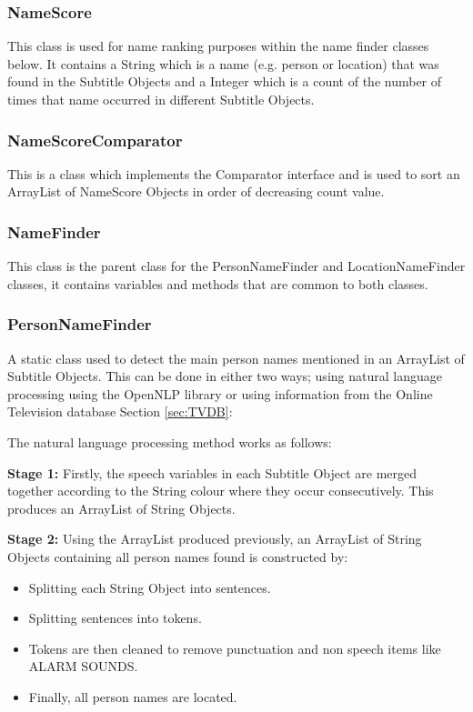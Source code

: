 \subsubsection{NameScore}
This class is used for name ranking purposes within the name finder classes below. It contains a String which is a name (e.g. person or 
location) that was found in the Subtitle Objects and a Integer which is a count of the number of times that name occurred in different 
Subtitle Objects.

\subsubsection{NameScoreComparator}
This is a class which implements the Comparator interface and is used to sort an ArrayList
of NameScore Objects in order of decreasing count value.

\subsubsection{NameFinder}
This class is the parent class for the PersonNameFinder and LocationNameFinder classes, it contains variables and methods that are common to both classes.

\subsubsection{PersonNameFinder}
\label{sec:PersonNameFinder}
A static class used to detect the main person names mentioned in an ArrayList of Subtitle
Objects. This can be done in either two ways; using natural language processing using the OpenNLP library \cite{nlp} or using information from the Online Television database Section \ref{sec:TVDB}: 

The natural language processing method works as follows:

\textbf{Stage 1:} Firstly, the speech variables in each Subtitle Object are merged together according to the String colour where they occur consecutively. This produces an ArrayList of String Objects.

\textbf{Stage 2:} Using the ArrayList produced previously, an ArrayList of String Objects containing all person names found is constructed by:
\begin{itemize}
	\item{Splitting each String Object into sentences.}
	\item{Splitting sentences into tokens.}
	\item{Tokens are then cleaned to remove punctuation and non speech items like ALARM SOUNDS.}
	\item{Finally, all person names are located.}
\end{itemize}

